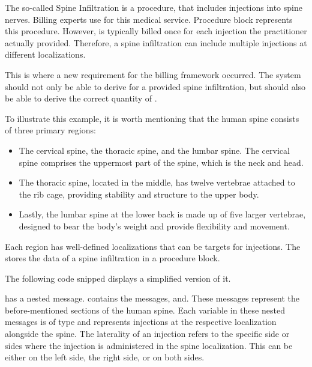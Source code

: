 The so-called Spine Infiltration is a procedure, that includes injections into spine nerves.
Billing experts use  for this medical service.
Procedure block  represents this procedure.
However,  is typically billed once for each injection the practitioner actually provided.
Therefore, a spine infiltration can include multiple injections at different localizations.

This is where a new requirement for the billing framework occurred.
The system should not only be able to derive  for a provided spine infiltration, but should also be able to derive the correct quantity of .

To illustrate this example, it is worth mentioning that the human spine consists of three primary regions:
\begin{itemize}
    \item The cervical spine, the thoracic spine, and the lumbar spine.
    The cervical spine comprises the uppermost part of the spine, which is the neck and head.
    \item The thoracic spine, located in the middle, has twelve vertebrae attached to the rib cage, providing stability and structure to the upper body.
    \item Lastly, the lumbar spine at the lower back is made up of five larger vertebrae, designed to bear the body's weight and provide flexibility and movement.
\end{itemize}
Each region has well-defined localizations that can be targets for injections.
The \AVS stores the data of a spine infiltration in a procedure block.

The following code snipped displays a simplified version of it.



 has a nested message.
 contains the messages, and.
These messages represent the before-mentioned sections of the human spine.
Each variable in these nested messages is of type and represents injections at the respective localization alongside the spine.
The laterality of an injection refers to the specific side or sides where the injection is administered in the spine localization.
This can be either on the left side, the right side, or on both sides.

